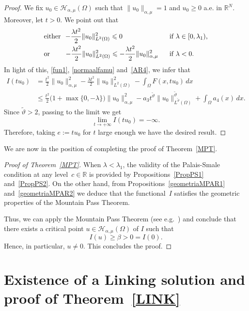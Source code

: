 \documentclass[12pt,a4paper,intlimits,sumlimits]{amsart}
\def \R {\mathbb{R}}
\theoremstyle{definition}
\theoremstyle{plain}
\numberwithin{equation}{section}
\renewcommand{\leq}{\leqslant}
\renewcommand{\le}{\leqslant}
\renewcommand{\geq}{\geqslant}
\begin{document}
\begin{proof}
We fix $u_0\in \mathcal{H}_{\alpha,\mu}(\Omega)$ such that $\|u_0\|_{\alpha,\mu}=1$ and $u_0\geq 0$ a.e. in $\R^N$. Moreover, let $t>0$. We point out that
\begin{alignat*}{2}
&\mbox{either $ \ -\displaystyle\frac{\lambda t^2}{2}\|u_0\|_{L^2(\Omega)}^2\le 0$} &&\mbox{ \ if $\lambda\in [0,\lambda_1)$,}\\
&\mbox{or \qquad$-\displaystyle\frac{\lambda t^2}{2}\|u_0\|_{L^2(\Omega)}^2\le -\dfrac{\lambda t^2}{2}\|u_0\|_{\alpha,\mu}^2$} &&\mbox{ \ if $\lambda<0$.}
\end{alignat*}
In light of this, \eqref{fun1}, \eqref{normaalfamu} and~\eqref{AR4}, we infer that
\[
\begin{aligned}
I(tu_0)&=\frac{t^2}{2}\|u_0\|_{\alpha,\mu}^2-\frac{\lambda t^2}{2}\|u_0\|_{L^2(\Omega)}^2
-\int_\Omega F(x,tu_0)\,dx  \\
&\leq \frac{t^2}{2} \big(1+\max\{0,-\lambda\}\big)\|u_0\|_{\alpha,\mu}^2
-a_3t^{\widetilde{\vartheta}}\|u_0\|_{L^{\widetilde{\vartheta}}(\Omega)}^{\widetilde{\vartheta}}
+\int_\Omega a_4(x)\,dx.
\end{aligned}
\]
Since $\widetilde{\vartheta}>2$, passing to the limit we get
\[
\lim_{t\to+\infty}I(tu_0)=-\infty.
\]
Therefore, taking $e:=tu_0$ for $t$ large enough we have the desired result.
\end{proof}

We are now in the position of completing the proof of Theorem~\ref{MPT}.

\begin{proof}[Proof of Theorem~\ref{MPT}]
When $\lambda<\lambda_1$, the validity of the Palais-Smale condition at any level~$c\in\R$ is provided by Propositions~\ref{PropPS1} and~\ref{PropPS2}. On the other hand, from Propositions~\ref{geometriaMPAR1} and~\ref{geometriaMPAR2} we deduce that the functional~$I$ satisfies the geometric properties of the Mountain Pass Theorem.

Thus, we can apply the Mountain Pass Theorem (see e.g.~\cite[Theorem~6.1]{struwe}) and conclude that there exists a critical point $u\in\mathcal{H}_{\alpha,\mu}(\Omega)$ of $I$ such that
\[
I(u)\geq \beta >0=I(0).
\]
Hence, in particular, $u\neq 0$. This concludes the proof.
\end{proof}

\section{Existence of a Linking solution and proof of Theorem~\ref{LINK}}\label{sec-link}
\end{document}
